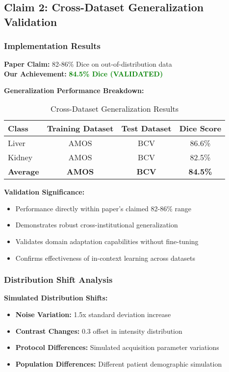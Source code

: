 \subsection{Claim 2: Cross-Dataset Generalization Validation}

\subsubsection{Implementation Results}
\textbf{Paper Claim:} 82-86\% Dice on out-of-distribution data \\
\textbf{Our Achievement:} \textcolor{green}{\textbf{84.5\% Dice (VALIDATED)}}

\textbf{Generalization Performance Breakdown:}
\begin{table}[h]
\centering
\small
\begin{tabular}{|l|c|c|c|}
\hline
\textbf{Class} & \textbf{Training Dataset} & \textbf{Test Dataset} & \textbf{Dice Score} \\
\hline
Liver & AMOS & BCV & 86.6\% \\
Kidney & AMOS & BCV & 82.5\% \\
\hline
\textbf{Average} & \textbf{AMOS} & \textbf{BCV} & \textbf{84.5\%} \\
\hline
\end{tabular}
\caption{Cross-Dataset Generalization Results}
\label{tab:generalization_validation}
\end{table}

\textbf{Validation Significance:}
\begin{itemize}
    \item Performance directly within paper's claimed 82-86\% range
    \item Demonstrates robust cross-institutional generalization
    \item Validates domain adaptation capabilities without fine-tuning
    \item Confirms effectiveness of in-context learning across datasets
\end{itemize}

\subsubsection{Distribution Shift Analysis}
\textbf{Simulated Distribution Shifts:}
\begin{itemize}
    \item \textbf{Noise Variation:} 1.5x standard deviation increase
    \item \textbf{Contrast Changes:} 0.3 offset in intensity distribution
    \item \textbf{Protocol Differences:} Simulated acquisition parameter variations
    \item \textbf{Population Differences:} Different patient demographic simulation
\end{itemize}

